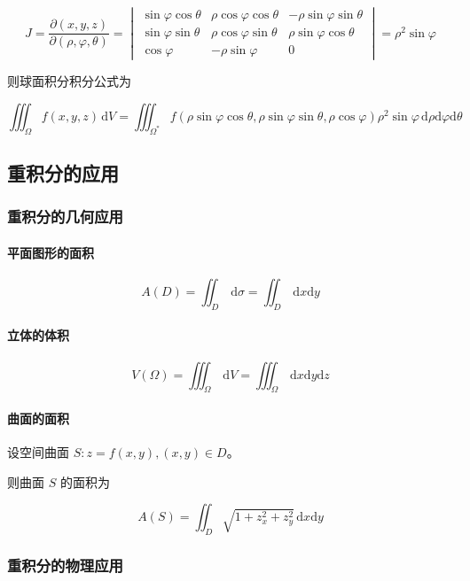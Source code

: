 \documentclass[lang = zh , final , oneside , openany , titlepage , zihao = -4 , linespread = 1.3 , baselineskip = false , cjk-font = windows , text-font = newtx , math-font = newtx]{sjtureport}
\begin{document}
\[
J = \frac{\partial (x,y,z)}{\partial (\rho,\varphi,\theta)} = \begin{vmatrix}
\sin\varphi\cos\theta & \rho\cos\varphi\cos\theta & -\rho\sin\varphi\sin\theta\\
\sin\varphi\sin\theta & \rho\cos\varphi\sin\theta & \rho\sin\varphi\cos\theta\\
\cos\varphi & -\rho\sin\varphi & 0
\end{vmatrix} = \rho^2\sin\varphi
\]

则球面积分积分公式为

\[
\iiint_\Omega f(x,y,z)\,\mathrm{d}V = \iiint_{\Omega^*} f(\rho\sin\varphi\cos\theta,\rho\sin\varphi\sin\theta,\rho\cos\varphi)\rho^2\sin\varphi\,\mathrm{d}\rho\mathrm{d}\varphi\mathrm{d}\theta
\]

\subsection{重积分的应用}

\subsubsection{重积分的几何应用}

\paragraph{平面图形的面积}

\[
A(D) = \iint_D \,\mathrm{d}\sigma = \iint_D \,\mathrm{d}x\mathrm{d}y
\]

\paragraph{立体的体积}

\[
V(\Omega) = \iiint_\Omega \,\mathrm{d}V = \iiint_\Omega \,\mathrm{d}x\mathrm{d}y\mathrm{d}z
\]

\paragraph{曲面的面积}

设空间曲面 \(S:z = f(x,y),(x,y)\in D\)。

则曲面 \(S\) 的面积为

\[
A(S) = \iint_D \sqrt{1 + z_x^2 + z_y^2}\,\mathrm{d}x\mathrm{d}y
\]

\subsubsection{重积分的物理应用}
\end{document}
